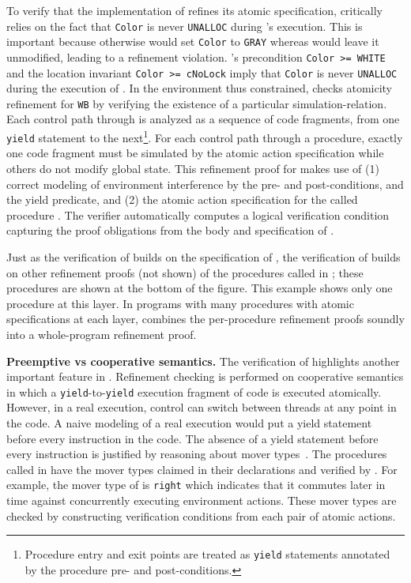 To verify that the implementation of  refines its atomic specification, \civl critically relies on the fact that {\tt Color} is never {\tt UNALLOC} during 's execution. 
This is important because otherwise  would set {\tt Color} to {\tt GRAY} whereas  would leave it unmodified, leading to a refinement violation. 
's precondition {\tt Color >=  WHITE} and the location invariant {\tt Color >= cNoLock} imply that {\tt Color} is never {\tt UNALLOC} during the execution of . 
In the environment thus constrained, \civl checks atomicity refinement for {\tt WB} by verifying the existence of a particular simulation-relation. 
Each control path through  is analyzed as a sequence of code fragments, from one {\tt yield} statement to the next\footnote{Procedure entry and exit points are treated as {\tt yield} statements annotated by the procedure pre- and post-conditions.}.
For each control path through a procedure, exactly one code fragment must be simulated by the atomic action specification while others do not modify global state.
This refinement proof for  makes use of (1) correct modeling of environment interference by the pre- and post-conditions, and the yield predicate, and (2) the atomic action specification for the called procedure . 
The \civl verifier automatically computes a logical verification condition capturing the proof obligations from the body and specification of .

Just as the verification of  builds on the specification of , the verification of  builds on other refinement proofs (not shown) of the procedures called in ; these procedures are shown at the bottom of the figure. 
This example shows only one procedure at this layer. In programs with many procedures with atomic specifications at each layer, \civl combines the per-procedure refinement proofs soundly into a whole-program refinement proof. 

{\bf Preemptive vs cooperative semantics.}
The verification of  highlights another important feature in \civl. 
Refinement checking is performed on cooperative semantics in which a 
{\tt yield}-to-{\tt yield} execution fragment of code is executed atomically.
However, in a real execution, control can switch between threads at any point in the code. 
A naive modeling of a real execution would put a yield statement before every instruction in the code.
The absence of a yield statement before every instruction is justified by reasoning about mover types~\cite{FlanaganFLQ08}. 
The procedures called in  have the mover types claimed in their
declarations and verified by \civl. 
For example, the mover type of  is {\tt right} which indicates 
that it commutes later in time against concurrently executing
environment actions. 
These mover types are checked by constructing verification conditions from each pair of atomic actions.

